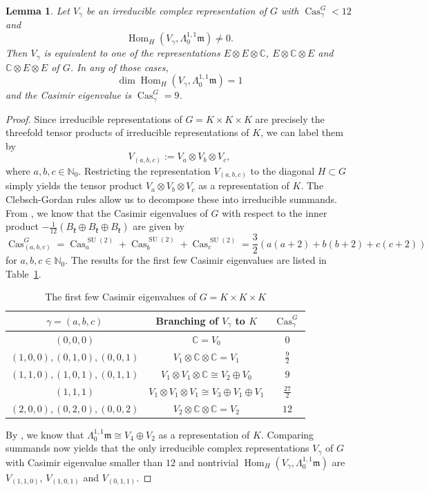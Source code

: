 \documentclass[12pt]{scrartcl}
\theoremstyle{plain}
\newtheorem{lem}[satz]{Lemma}
\theoremstyle{definition}
\newcommand{\C}{\mathbb{C}}%
\newcommand{\N}{\mathbb{N}}%
\newcommand{\Hom}{\operatorname{Hom}}%
\newcommand{\Cas}{\operatorname{Cas}}%
\newcommand{\SU}{\operatorname{SU}}%
\newcommand{\m}{\mathfrak{m}}%
\renewcommand{\k}{\mathfrak{k}}%
\begin{document}
\begin{lem}\label{subcrit1}
 Let $V_{\gamma}$ be an irreducible complex representation of $G$ with $\Cas^G_\gamma<12$ and
 \[\Hom_H(V_\gamma,\Lambda^{1,1}_0\m)\neq0.\]
 Then $V_\gamma$ is equivalent to one of the representations $E\otimes E\otimes\C$, $E\otimes\C\otimes E$ and $\C\otimes E\otimes E$ of $G$. In any of those cases,
 \[\dim\Hom_H(V_\gamma,\Lambda^{1,1}_0\m)=1\]
 and the Casimir eigenvalue is $\Cas_\gamma^G=9$.
\end{lem}
\begin{proof}
Since irreducible representations of $G=K\times K\times K$ are precisely the threefold tensor products of irreducible representations of $K$, we can label them by
\[V_{(a,b,c)}:=V_a\otimes V_b\otimes V_c,\]
where $a,b,c\in\N_0$. Restricting the representation $V_{(a,b,c)}$ to the diagonal $H\subset G$ simply yields the tensor product $V_a\otimes V_b\otimes V_c$ as a representation of $K$. The Clebsch-Gordan rules allow us to decompose these into irreducible summands. From \cite[(31)]{hermitianlaplace}, we know that the Casimir eigenvalues of $G$ with respect to the inner product $-\frac{1}{12}(B_\k\oplus B_\k\oplus B_\k)$ are given by
\[\Cas^G_{(a,b,c)}=\Cas^{\SU(2)}_a+\Cas^{\SU(2)}_b+\Cas^{\SU(2)}_c=\frac{3}{2}(a(a+2)+b(b+2)+c(c+2))\]
for $a,b,c\in\N_0$. The results for the first few Casimir eigenvalues are listed in Table~\ref{CasG}.

\begin{table}[h]
\centering
\begin{tabular}{c|c|c}
$\gamma=(a,b,c)$&Branching of $V_\gamma$ to $K$&$\Cas_\gamma^G$\\\hline
$(0,0,0)$&$\C=V_0$&0\\
$(1,0,0),(0,1,0),(0,0,1)$&$V_1\otimes\C\otimes\C=V_1$&$\frac{9}{2}$\\
$(1,1,0),(1,0,1),(0,1,1)$&$V_1\otimes V_1\otimes\C\cong V_2\oplus V_0$&$9$\\
$(1,1,1)$&$V_1\otimes V_1\otimes V_1\cong V_3\oplus V_1\oplus V_1$&$\frac{27}{2}$\\
$(2,0,0),(0,2,0),(0,0,2)$&$V_2\otimes\C\otimes\C=V_2$&$12$
\end{tabular}
\caption{The first few Casimir eigenvalues of $G=K\times K\times K$}
\label{CasG}
\end{table}

By \cite[Lem. 5.5]{hermitianlaplace}, we know that $\Lambda^{1,1}_0\m\cong V_4\oplus V_2$ as a representation of $K$. Comparing summands now yields that the only irreducible complex representations $V_\gamma$ of $G$ with Casimir eigenvalue smaller than $12$ and nontrivial $\Hom_H(V_\gamma,\Lambda^{1,1}_0\m)$ are $V_{(1,1,0)}$, $V_{(1,0,1)}$ and $V_{(0,1,1)}$.
\end{proof}
\end{document}
